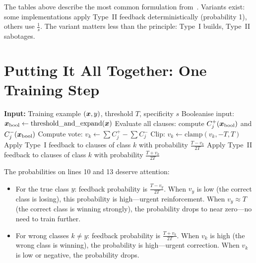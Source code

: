 \begin{engineernote}
The tables above describe the most common formulation
from~\cite{granmo2018tsetlin}. Variants exist: some
implementations apply Type~II feedback deterministically (probability
1), others use $\frac{1}{s}$. The variant matters less than the
principle: Type~I builds, Type~II sabotages.
\end{engineernote}


\section{Putting It All Together: One Training Step}
\label{sec:training-step}

\begin{algorithm}[htbp]
\caption{One training step of the Tsetlin Machine.}
\label{alg:tm-train}
\begin{algorithmic}[1]
  \State \textbf{Input:} Training example $(\bm{x}, y)$, threshold $T$,
    specificity $s$
  \State Booleanise input: $\bm{x}_{\text{bool}} \leftarrow
    \text{threshold\_and\_expand}(\bm{x})$
    \State Evaluate all clauses: compute $C_j^+(\bm{x}_{\text{bool}})$
      and $C_j^-(\bm{x}_{\text{bool}})$
    \State Compute vote: $v_k \leftarrow \sum C_j^+ - \sum C_j^-$
    \State Clip: $v_k \leftarrow \text{clamp}(v_k, -T, T)$
  \EndFor
  \Statex
     
      \State Apply Type~I feedback to clauses of class $k$
      \Statex \quad\quad with probability $\frac{T - v_k}{2T}$
    \Else {}
      \State Apply Type~II feedback to clauses of class $k$
      \Statex \quad\quad with probability $\frac{T + v_k}{2T}$
    \EndIf
  \EndFor
\end{algorithmic}
\end{algorithm}

The probabilities on lines 10 and 13 deserve attention:

\begin{itemize}
  \item For the true class $y$: feedback probability is
    $\frac{T - v_y}{2T}$. When $v_y$ is low (the correct class is
    losing), this probability is high---urgent reinforcement. When
    $v_y \approx T$ (the correct class is winning strongly), the
    probability drops to near zero---no need to train further.

  \item For wrong classes $k \neq y$: feedback probability is
    $\frac{T + v_k}{2T}$. When $v_k$ is high (the wrong class is
    winning), the probability is high---urgent correction. When
    $v_k$ is low or negative, the probability drops.
\end{itemize}

